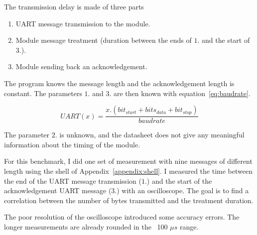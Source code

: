 The transmission delay is made of three parts

\begin{enumerate}
  \item UART message transmission to the module.
  \item Module message treatment (duration between the ends of $1.$ and the start of $3.$).
  \item Module sending back an acknowledgement.
\end{enumerate}

The program knows the message length and the acknowledgement length is constant.
The parameters $1.$ and $3.$ are then known with equation~\ref{eq:baudrate}.

\begin{equation}
  \label{eq:baudrate}
  UART(x) = \frac{x . (bit_{start} + bits_{data} + bit_{stop})}{baudrate}
\end{equation}

The parameter $2.$ is unknown, and the datasheet does not give any meaningful
information about the timing of the module.

For this benchmark, I did one set of measurement with nine messages of different
length using the shell of Appendix~\ref{appendix:shell}.
I measured the time between the end of the UART message transmission ($1.$) and the
start of the acknowledgement UART message ($3.$) with an oscilloscope.
The goal is to find a correlation between the number of bytes transmitted and
the treatment duration.

The poor resolution of the oscilloscope introduced some accuracy errors.
The longer measurements are already rounded in the ~100 $\mu s$ range.


